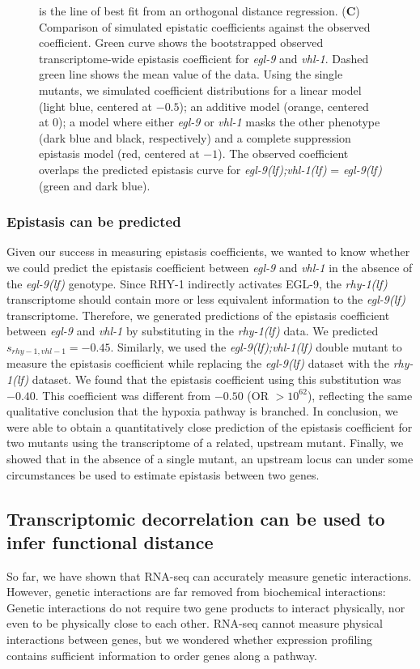 \documentclass[10pt, onecolumn]{article}
\newcommand{\gene}[1]{\emph{#1}}
\newcommand{\egl}{\emph{\mbox{egl-9}(lf)}}
\newcommand{\rhy}{\emph{\mbox{rhy-1}(lf)}}
\newcommand{\eglvhl}{\emph{\mbox{egl-9(lf);vhl-1(lf)}}}
\newcommand{\eglp}{EGL-9}
\newcommand{\rhyp}{RHY-1}
\begin{document}
\begin{figure}[tbhp]
{is the line of best fit from an orthogonal distance regression.
(\textbf{C}) Comparison of simulated epistatic coefficients against the observed
coefficient. Green curve shows the bootstrapped observed transcriptome-wide
epistasis coefficient for \gene{egl-9} and \gene{vhl-1}. Dashed green line shows
the mean value of the data. Using the single mutants, we simulated coefficient
distributions for a linear model (light blue, centered at $-0.5$); an additive
model (orange, centered at 0); a model where either \gene{egl-9} or \gene{vhl-1}
masks the other phenotype (dark blue and black, respectively) and a complete
suppression epistasis model (red, centered at $-1$). The observed coefficient
overlaps the predicted epistasis curve for \eglvhl{} = \egl{} (green and dark
blue).
}
\label{fig:egl9epistasis}
\end{figure}

\subsubsection*{Epistasis can be predicted}
Given our success in measuring epistasis coefficients, we wanted to know whether
we could predict the epistasis coefficient between \gene{egl-9} and \gene{vhl-1}
in the absence of the \egl{} genotype. Since \rhyp{} indirectly activates
\eglp{}, the \rhy{} transcriptome should contain more or less equivalent
information to the \egl{} transcriptome. Therefore, we generated predictions of
the epistasis coefficient between \gene{egl-9} and \gene{vhl-1} by substituting
in the \rhy{} data. We predicted $s_{rhy-1,vhl-1} = -0.45$. Similarly, we used
the \eglvhl{} double mutant to measure the epistasis coefficient while replacing
the \egl{} dataset with the \rhy{} dataset. We found that the epistasis
coefficient using this substitution was $-0.40$. This coefficient was different
from $-0.50$ (OR $>10^{62}$), reflecting the same qualitative conclusion that
the hypoxia pathway is branched. In conclusion, we were able to obtain a
quantitatively close prediction of the epistasis coefficient for two mutants
using the transcriptome of a related, upstream mutant. Finally, we showed that
in the absence of a single mutant, an upstream locus can under some circumstances
be used to estimate epistasis between two genes.

\subsection*{Transcriptomic decorrelation can be used to infer functional distance}
\label{sub:decorrelation}
So far, we have shown that RNA-seq can accurately measure genetic interactions.
However, genetic interactions are far removed from biochemical interactions:
Genetic interactions do not require two gene products to interact physically, nor
even to be physically close to each other. RNA-seq cannot measure physical
interactions between genes, but we wondered whether expression profiling contains
sufficient information to order genes along a pathway.
\end{document}

